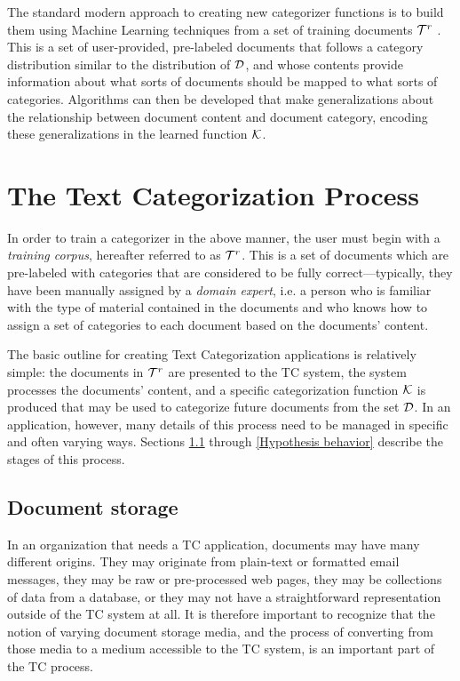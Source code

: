 The standard modern approach to creating new categorizer functions is
to build them using Machine Learning techniques from a set of training
documents $\mathcal{T}^r$ \cite[p. 2]{sebastiani:02}. This is a set of
user-provided, pre-labeled documents that follows a category
distribution similar to the distribution of $\mathcal{D}$, and whose contents
provide information about what sorts of documents should be mapped to
what sorts of categories.  Algorithms can then be developed that make
generalizations about the relationship between document content and
document category, encoding these generalizations in the learned function $\mathcal{K}$.



\section{The Text Categorization Process}
\label{tc-process}

In order to train a categorizer in the above manner, the user must
begin with a \emph{training corpus},
hereafter referred to as $\mathcal{T}^r$.  This is a set of documents which
are pre-labeled with categories that are considered to be fully
correct---typically, they have been manually assigned by a
\emph{domain expert}, i.e. a person who is familiar with the type of
material contained in the documents and who knows how to assign a set
of categories to each document based on the documents' content.

The basic outline for creating Text Categorization applications is relatively simple: the
documents in $\mathcal{T}^r$ are presented to the TC system, the system
processes the documents' content, and a specific categorization
function $\mathcal{K}$ is produced that may be used to categorize future documents
from the set $\mathcal{D}$.  In an application, however, many details of
this process need to be managed in specific and often varying ways.
Sections \ref{Document storage} through \ref{Hypothesis behavior}
describe the stages of this process.

\subsection{Document storage}
\label{Document storage}

In an organization that needs a TC application, documents may have
many different origins.  They may originate from plain-text or
formatted email messages, they may be raw or pre-processed web pages,
they may be collections of data from a database, or they may not have
a straightforward representation outside of the TC system at all.  It
is therefore important to recognize that the notion of varying
document storage media, and the process of converting from those media
to a medium accessible to the TC system, is an important part of the
TC process.

